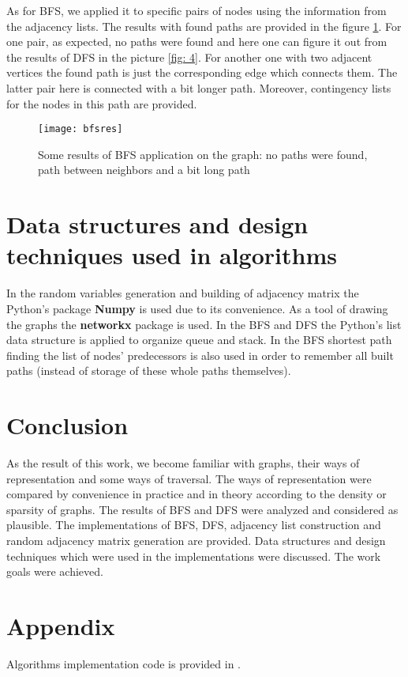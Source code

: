 \documentclass[12pt, bachelor, substylefile = algo_title.rtx]{disser}
\theoremstyle{definition}
\begin{document}
As for BFS, we applied it to specific pairs of nodes using the information from the adjacency lists. The results with found paths are provided in the figure \ref{fig: 6}. For one pair, as expected, no paths were found and here one can figure it out from the results of DFS in the picture \ref{fig: 4}. For another one with two adjacent vertices the found path is just the corresponding edge which connects them. The latter pair here is connected with a bit longer path. Moreover, contingency lists for the nodes in this path are provided. 

\begin{figure}[!h]
\begin{center}
\texttt{[image: bfsres]}
\caption{Some results of BFS application on the graph: no paths were found, path between neighbors and a bit long path}
\label{fig: 6}
\end{center}
\end{figure}


\section{Data structures and design techniques used in algorithms}


In the random variables generation and building of adjacency matrix the Python's package \textbf{Numpy} is used due to its convenience. As a tool of drawing the graphs the \textbf{networkx} package is used. In the BFS and DFS the Python's list data structure is applied to organize queue and stack. In the BFS shortest path finding the list of nodes' predecessors is also used in order to remember all built paths (instead of storage of these whole paths themselves). 


\section{Conclusion}
As the result of this work, we become familiar with graphs, their ways of representation and some ways of traversal. The ways of representation were compared by convenience in practice and in theory according to the density or sparsity of graphs. The results of BFS and DFS were analyzed and considered as plausible. The implementations of BFS, DFS, adjacency list construction and random adjacency matrix generation are provided. Data structures and design techniques which were used in the implementations were discussed. The work goals were achieved.

\section{Appendix}
Algorithms implementation code is provided in \cite{repogithub}.

{\small }

\end{document}
